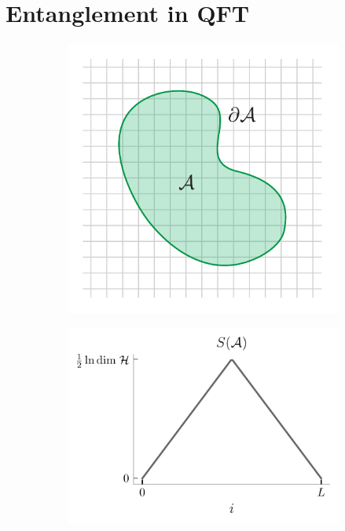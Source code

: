 \documentclass{report}
\begin{document}
\section{Entanglement in QFT}
\begin{figure}[t]
	\centering
	\begin{subfigure}[b]{0.35\textwidth}
		\centering
		\includegraphics[width=\textwidth]{figs/december/entanglement-lattice.pdf}
		\caption{}
		\label{fig:entanglement-lattice}
	\end{subfigure}
	\begin{subfigure}[b]{0.45\textwidth}
		\centering
		\includegraphics[width=\textwidth]{figs/december/page-curve.pdf}
		\caption{}
		\label{fig:entanglement-page-curve}
	\end{subfigure}
\end{figure}
\end{document}
